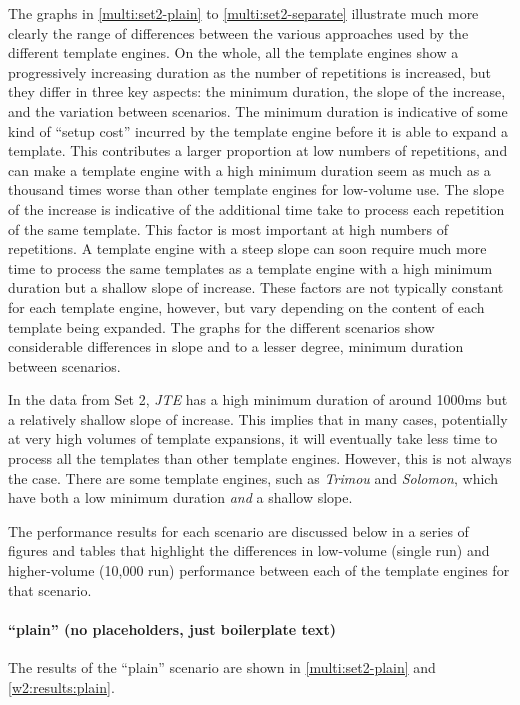 The graphs in \autoref{multi:set2-plain} to \autoref{multi:set2-separate} illustrate much more clearly the range of differences between the various approaches used by the different \gls{template engine}s. On the whole, all the \gls{template engine}s show a progressively increasing duration as the number of repetitions is increased, but they differ in three key aspects: the minimum duration, the slope of the increase, and the variation between scenarios. The minimum duration is indicative of some kind of \enquote{setup cost} incurred by the \gls{template engine} before it is able to expand a template. This contributes a larger proportion at low numbers of repetitions, and can make a \gls{template engine} with a high minimum duration seem as much as a thousand times worse than other \gls{template engine}s for low-volume use. The slope of the increase is indicative of the additional time take to process each repetition of the same template. This factor is most important at high numbers of repetitions. A \gls{template engine} with a steep slope can soon require much more time to process the same templates as a \gls{template engine} with a high minimum duration but a shallow slope of increase. These factors are not typically constant for each \gls{template engine}, however, but vary depending on the content of each template being expanded. The graphs for the different scenarios show considerable differences in slope and to a lesser degree, minimum duration between scenarios.

\label{A149}
In the data from Set 2, \emph{JTE} has a high minimum duration of around 1000ms but a relatively shallow slope of increase. This implies that in many cases, potentially at very high volumes of template expansions, it will eventually take less time to process all the templates than other \gls{template engine}s. However, this is not always the case. There are some \gls{template engine}s, such as \emph{Trimou} and \emph{Solomon}, which have both a low minimum duration \emph{and} a shallow slope.

\label{A155}
The performance results for each scenario are discussed below in a series of figures and tables that highlight the differences in low-volume (single run) and higher-volume (10,000 run) performance between each of the template engines for that scenario.

\paragraph{\enquote{plain} (no placeholders, just boilerplate text)}
\label{A150}
The results of the \enquote{plain} scenario are shown in \autoref{multi:set2-plain} and \autoref{w2:results:plain}.

